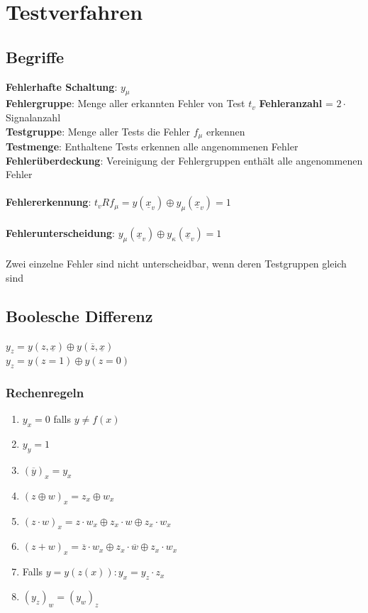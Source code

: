 \documentclass[a4paper,twocolumn,10pt]{article}
\begin{document}
\section*{Testverfahren}
\subsection*{Begriffe}
\textbf{Fehlerhafte Schaltung}: $y_\mu$\\
\textbf{Fehlergruppe}: Menge aller erkannten Fehler von Test $t_v$
\textbf{Fehleranzahl} = $2\cdot$ Signalanzahl\\
\textbf{Testgruppe}: Menge aller Tests die Fehler $f_\mu$ erkennen\\
\textbf{Testmenge}: Enthaltene Tests erkennen alle angenommenen Fehler\\
\textbf{Fehlerüberdeckung}: Vereinigung der Fehlergruppen enthält alle angenommenen Fehler\\\\
\textbf{Fehlererkennung}: $t_vRf_\mu=y(\underline{x}_v) \oplus y_\mu(\underline{x}_v)=1$\\\\
\textbf{Fehlerunterscheidung}: $y_\mu(\underline{x}_v) \oplus y_\kappa(\underline{x}_v)=1$\\\\
Zwei einzelne Fehler sind nicht unterscheidbar, wenn deren Testgruppen gleich sind

\subsection*{Boolesche Differenz}
$y_z=y(z,\underline{x}) \oplus y(\overline{z},\underline{x})$\\
$y_z=y(z=1) \oplus y(z=0)$

\subsubsection*{Rechenregeln}
\begin{enumerate}
	\item $y_x=0$ falls $y\neq f(x)$
	\item $y_y=1$
	\item $(\overline{y})_x=y_x$
	\item $(z \oplus w)_x=z_x\oplus w_x$
	\item $(z\cdot w)_x=z\cdot w_x\oplus z_x\cdot w \oplus z_x\cdot w_x$
	\item $(z+w)_x=\overline{z}\cdot w_x\oplus z_x\cdot \overline{w} \oplus z_x\cdot w_x$
	\item Falls $y=y(z(x)) : y_x=y_z\cdot z_x$
	\item $(y_z)_w=(y_w)_z$
\end{enumerate}	
\end{document}

